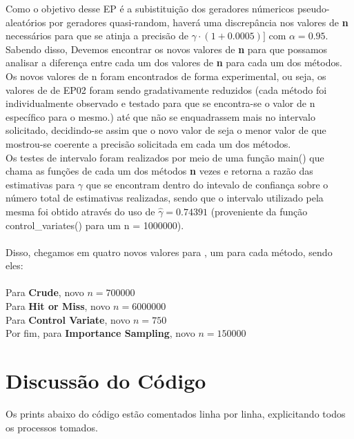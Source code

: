 \documentclass{article}
\begin{document}
    Como o objetivo desse EP é a subistituição dos geradores númericos pseudo-aleatórios por geradores quasi-random, haverá uma discrepância nos valores de \textbf{n} necessários para que se atinja a precisão de $\gamma\cdot(1 + 0.0005)]$ com $\alpha=0.95$. Sabendo disso, Devemos encontrar os novos valores de \textbf{n} para que possamos analisar a diferença entre cada um dos valores de \textbf{n} para cada um dos métodos.\\
    
    Os novos valores de n foram encontrados de forma experimental, ou seja, os valores de  de EP02 foram sendo gradativamente reduzidos (cada método foi individualmente observado e testado para que se encontra-se o valor de n específico para o mesmo.) até que não se enquadrassem mais no intervalo solicitado, decidindo-se assim que o novo valor de  seja o menor valor de  que mostrou-se coerente a precisão solicitada em cada um dos métodos.\\
    
    Os testes de intervalo foram realizados por meio de uma função main() que chama as funções de cada um dos métodos \textbf{n} vezes e retorna a razão das estimativas para $\gamma$ que se encontram dentro do intevalo de confiança sobre o número total de estimativas realizadas, sendo que o intervalo utilizado pela mesma foi obtido através do uso de $\hat{\gamma} = 0.74391$ (proveniente da função control\_variates() para um n = 1000000).\\
    \\
    Disso, chegamos em quatro novos valores para , um para cada método, sendo eles:\\
    \\
    Para \textbf{Crude}, novo $n = 700000$\\
    Para \textbf{Hit or Miss}, novo $n = 6000000$\\
    Para \textbf{Control Variate}, novo $n =  750$\\ 
    Por fim, para \textbf{Importance Sampling}, novo $n = 150000$\\

\section{Discussão do Código}

Os prints abaixo do código estão comentados linha por linha, explicitando todos os processos tomados.
\end{document}

